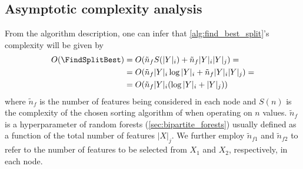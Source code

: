 

\subsection{Asymptotic complexity analysis}
\label{sec:complexity_analysis}


From the algorithm description, one can infer that \ref{alg:find_best_split}'s complexity will be given by
%
\begin{align}
    O(\FindSplitBest)
    &= O(\tilde n_f S(|Y|_i) + \tilde n_f |Y|_i|Y|_j)
    =\nonumber\\
    &= O(\tilde n_f |Y|_i \log |Y|_i + \tilde n_f |Y|_i|Y|_j)
    =\nonumber\\
    &= O(\tilde n_f |Y|_i (\log |Y|_i + |Y|_j))
    \label{eq:O_find_best_split}
\end{align}
where $\tilde n_f$ is the number of features being considered in each node and $S(n)$ is the complexity of the chosen sorting algorithm of \atoref{} when operating on $n$ values. $\tilde n_f$ is a hyperparameter of random forests (\autoref{sec:bipartite_forests}) usually defined as a function of the total number of features $|X|_j$. We further employ $\tilde n_{f1}$ and $\tilde n_{f2}$ to refer to the number of features to be selected from $X_1$ and $X_2$, respectively, in each node.

